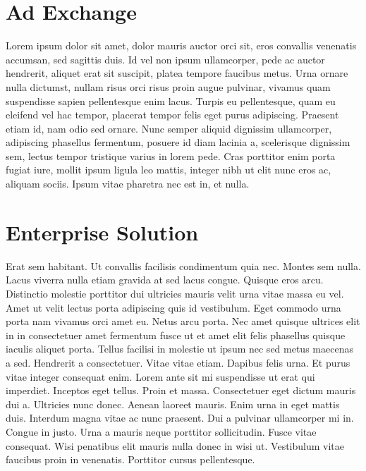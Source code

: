 \documentclass[letterpaper,10pt,openany,oneside,english]{sphinxmanual}
\begin{document}
\section{Ad Exchange}
\label{\detokenize{adexchange:ad-exchange}}\label{\detokenize{adexchange::doc}}
Lorem ipsum dolor sit amet, dolor mauris auctor orci sit, eros convallis venenatis accumsan, sed sagittis duis. Id vel non ipsum ullamcorper, pede ac auctor hendrerit, aliquet erat sit suscipit, platea tempore faucibus metus. Urna ornare nulla dictumst, nullam risus orci risus proin augue pulvinar, vivamus quam suspendisse sapien pellentesque enim lacus. Turpis eu pellentesque, quam eu eleifend vel hac tempor, placerat tempor felis eget purus adipiscing. Praesent etiam id, nam odio sed ornare. Nunc semper aliquid dignissim ullamcorper, adipiscing phasellus fermentum, posuere id diam lacinia a, scelerisque dignissim sem, lectus tempor tristique varius in lorem pede. Cras porttitor enim porta fugiat iure, mollit ipsum ligula leo mattis, integer nibh ut elit nunc eros ac, aliquam sociis. Ipsum vitae pharetra nec est in, et nulla.


\section{Enterprise Solution}
\label{\detokenize{enterprisesolution:enterprise-solution}}\label{\detokenize{enterprisesolution::doc}}
Erat sem habitant. Ut convallis facilisis condimentum quia nec. Montes sem nulla. Lacus viverra nulla etiam gravida at sed lacus congue. Quisque eros arcu. Distinctio molestie porttitor dui ultricies mauris velit urna vitae massa eu vel. Amet ut velit lectus porta adipiscing quis id vestibulum. Eget commodo urna porta nam vivamus orci amet eu. Netus arcu porta. Nec amet quisque ultrices elit in in consectetuer amet fermentum fusce ut et amet elit felis phasellus quisque iaculis aliquet porta. Tellus facilisi in molestie ut ipsum nec sed metus maecenas a sed. Hendrerit a consectetuer. Vitae vitae etiam. Dapibus felis urna. Et purus vitae integer consequat enim. Lorem ante sit mi suspendisse ut erat qui imperdiet. Inceptos eget tellus. Proin et massa. Consectetuer eget dictum mauris dui a. Ultricies nunc donec. Aenean laoreet mauris. Enim urna in eget mattis duis. Interdum magna vitae ac nunc praesent. Dui a pulvinar ullamcorper mi in. Congue in justo. Urna a mauris neque porttitor sollicitudin. Fusce vitae consequat. Wisi penatibus elit mauris nulla donec in wisi ut. Vestibulum vitae faucibus proin in venenatis. Porttitor cursus pellentesque.
\end{document}
